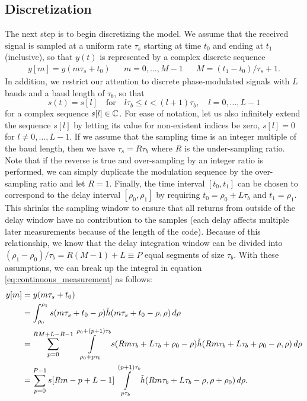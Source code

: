 \subsection{Discretization}
The next step is to begin discretizing the model. We assume that the received signal is sampled at a uniform rate $\tau_s$ starting at time $t_0$ and ending at $t_1$ (inclusive), so that $y(t)$ is represented by a complex discrete sequence
\begin{align}
 y[m] = y(m\tau_s + t_0) && m = 0,\dotsc,M-1 && M = (t_1 - t_0)/\tau_s + 1.
\end{align}
In addition, we restrict our attention to discrete phase-modulated signals with $L$ bauds and a baud length of $\tau_b$, so that
\begin{equation}
 s(t) = s[l]\quad \text{for}\quad l\tau_b \le t < (l + 1)\tau_b, \quad l = 0,\dotsc,L-1
\end{equation}
for a complex sequence $s[l] \in \mathbb{C}$. For ease of notation, let us also infinitely extend the sequence $s[l]$ by letting its value for non-existent indices be zero, $s[l] = 0$ for $l \ne 0,\dotsc,L-1$. If we assume that the sampling time is an integer multiple of the baud length, then we have $\tau_s = R\tau_b$ where $R$ is the under-sampling ratio. Note that if the reverse is true and over-sampling by an integer ratio is performed, we can simply duplicate the modulation sequence by the over-sampling ratio and let $R=1$. Finally, the time interval $[t_0, t_1]$ can be chosen to correspond to the delay interval $[\rho_0, \rho_1]$ by requiring $t_0 = \rho_0 + L\tau_b$ and $t_1 = \rho_1$. This shrinks the sampling window to ensure that all returns from outside of the delay window have no contribution to the samples (each delay affects multiple later measurements because of the length of the code). Because of this relationship, we know that the delay integration window can be divided into $(\rho_1 - \rho_0)/\tau_b = R(M-1) + L \equiv P$ equal segments of size $\tau_b$. With these assumptions, we can break up the integral in equation \eqref{eq:continuous_measurement} as follows:
\begin{align}\label{eq:discrete_transmission}
 y[m] &= y(m\tau_s + t_0)\nonumber\\
 &= \int_{\rho_0}^{\rho_1} s(m\tau_s + t_0 - \rho) \tilde{h}(m\tau_s + t_0 - \rho, \rho) \,d\rho\nonumber\\
 &= \sum_{p=0}^{RM+L-R-1} \int\limits_{\rho_0 + p\tau_b}^{\rho_0 + (p+1)\tau_b} s(Rm\tau_b + L\tau_b + \rho_0 - \rho) \tilde{h}(Rm\tau_b + L\tau_b + \rho_0 - \rho, \rho) \,d\rho\nonumber\\
 &= \sum_{p=0}^{P-1} s[Rm-p+L-1] \int\limits_{p\tau_b}^{(p+1)\tau_b} \tilde{h}(Rm\tau_b + L\tau_b - \rho, \rho + \rho_0) \,d\rho.
\end{align}

